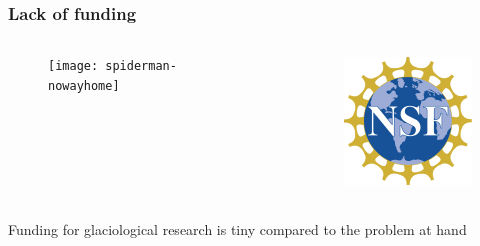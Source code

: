 \documentclass[hide notes,intlimits]{beamer}
\begin{document}
\begin{frame}
  \frametitle{Lack of funding}
  \begin{columns}[c]
    \begin{column}{.5\linewidth}
      \begin{figure}
        \texttt{[image: spiderman-nowayhome]}
      \end{figure}
    \end{column}
    \begin{column}{.5\linewidth}
      \begin{figure}
        \includegraphics[height=3.5cm]{nsf_logo_color}
      \end{figure}
    \end{column}
\end{columns}
\end{frame}


\begin{frame}
Funding for glaciological research is tiny compared to the problem at hand
\end{frame}
\end{document}
